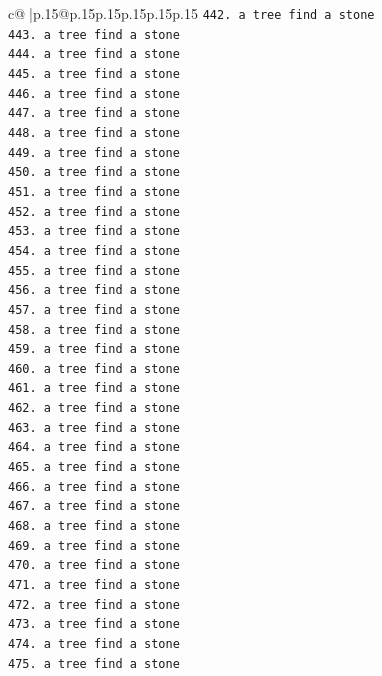 \documentclass{article}
\begin{document}
{\begin{supertabular}{c@{$\;$}|p{.15\linewidth}@{}p{.15\linewidth}p{.15\linewidth}p{.15\linewidth}p{.15\linewidth}p{.15\linewidth}}
{{{\texttt{442. a tree find a stone} \\
\texttt{443. a tree find a stone} \\
\texttt{444. a tree find a stone} \\
\texttt{445. a tree find a stone} \\
\texttt{446. a tree find a stone} \\
\texttt{447. a tree find a stone} \\
\texttt{448. a tree find a stone} \\
\texttt{449. a tree find a stone} \\
\texttt{450. a tree find a stone} \\
\texttt{451. a tree find a stone} \\
\texttt{452. a tree find a stone} \\
\texttt{453. a tree find a stone} \\
\texttt{454. a tree find a stone} \\
\texttt{455. a tree find a stone} \\
\texttt{456. a tree find a stone} \\
\texttt{457. a tree find a stone} \\
\texttt{458. a tree find a stone} \\
\texttt{459. a tree find a stone} \\
\texttt{460. a tree find a stone} \\
\texttt{461. a tree find a stone} \\
\texttt{462. a tree find a stone} \\
\texttt{463. a tree find a stone} \\
\texttt{464. a tree find a stone} \\
\texttt{465. a tree find a stone} \\
\texttt{466. a tree find a stone} \\
\texttt{467. a tree find a stone} \\
\texttt{468. a tree find a stone} \\
\texttt{469. a tree find a stone} \\
\texttt{470. a tree find a stone} \\
\texttt{471. a tree find a stone} \\
\texttt{472. a tree find a stone} \\
\texttt{473. a tree find a stone} \\
\texttt{474. a tree find a stone} \\
\texttt{475. a tree find a stone} \\
}}}
\end{supertabular}}
\end{document}
